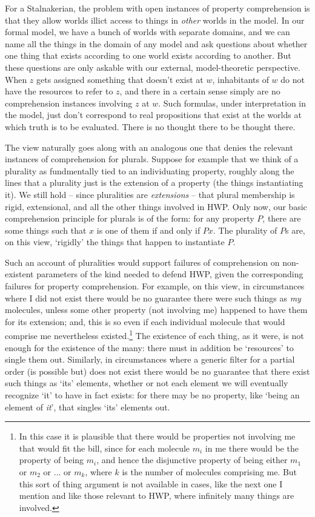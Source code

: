 \documentclass{article}
\begin{document}
For a Stalnakerian, the problem with open instances of property comprehension
is that they allow worlds illict access to things in \emph{other} 
worlds in the model.
In our formal model, we have a bunch of worlds with separate domains,
and we can name all the things in the domain of any model and ask 
questions about whether one thing that exists according to one world 
exists according to another. But these questions are only askable with 
our external, model-theoretic perspective. 
When $z$ gets assigned something that doesn't exist at $w$, 
inhabitants of $w$ do not have the resources to refer to $z$, 
and there in a certain sense simply are no comprehension instances 
involving $z$ at $w$.
Such formulas, 
under interpretation in the model,
just don't correspond to real propositions that exist at the 
worlds at which truth is to be evaluated.
There is no thought there to be thought there.

The view naturally goes along with an analogous one that
denies the relevant instances of comprehension for plurals.
Suppose for example that we think of a plurality as fundmentally 
tied to an individuating property, roughly along the lines that 
a plurality just is the extension of a property (the things instantiating it).
We still hold -- since pluralities are \emph{extensions} -- that plural membership 
is rigid, extensional, and all the other things involved in HWP. Only now, 
our basic comprehension principle for plurals is of the form: for any property 
$P$, there are some things such that $x$ is one of them if and only if $Px$. 
The plurality of $P$s are, on this view, `rigidly' 
the things that happen to instantiate $P$. 

Such an account of pluralities would support
failures of comprehension on non-existent parameters of 
the kind needed to defend HWP, given the corresponding 
failures for property comprehension.
For example, on this view, 
in circumstances where 
I did not exist there would be no guarantee there 
were such things as \emph{my} molecules,
unless some other property (not involving me) happened 
to have them for its extension;
and, this is so even if each individual molecule 
that would comprise me nevertheless existed.\footnote{
    In this case it is plausible that there would be properties
    not involving me that would fit the bill, 
    since for each molecule $m_i$ in me there 
    would be the property of being $m_i$, and 
    hence the disjunctive property of being either 
    $m_1$ or $m_2$ or ... or $m_k$, where $k$ 
    is the number of molecules comprising me. But this sort of thing argument 
    is not available in cases, like the next one I mention and like those 
    relevant to HWP,
    where infinitely many things are involved. 
}
The existence of each thing, as it were, is not 
enough for the existence of the many: there must 
in addition be `resources' to single them out.
Similarly, 
in circumstances where a generic filter
for a partial order (is possible but) does not exist there would be no guarantee 
that there exist such things 
as `its' elements, whether or not each element we will eventually 
recognize `it' to have in fact exists: for there may be no property, like 
`being an element of \emph{it}', that singles `its' elements out.
\end{document}
